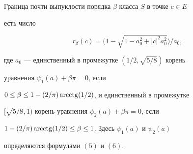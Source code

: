\begin{thm} 


Граница почти выпуклости порядка $\beta$ класса $S$ в точке $c\in E$ 


есть число 


\begin{equation} 


r_\beta(c)=\big(1-\sqrt{1-a^2_0+|c|^2a^2_0}\big)/a_0, 


\end{equation} 


где $a_0$ --- единственный в промежутке $(1/2,\sqrt{5/8})$ корень 


уравнения $\psi_1(a)+\beta\pi=0$, если 


$0\le\beta\le1-(2/\pi)\operatorname{arcctg}(1/2)$, и единственный в промежутке 


$[\sqrt{5/8},1)$ корень уравнения $\psi_2(a)+\beta\pi=0$, если 


$1-(2/\pi)\operatorname{arcctg}(1/2)\le\beta\le1$. Здесь $\psi_1(a)$ и $\psi_2(a)$ 


определяются формулами $(5)$ и $(6)$. 


\end{thm} 


 


